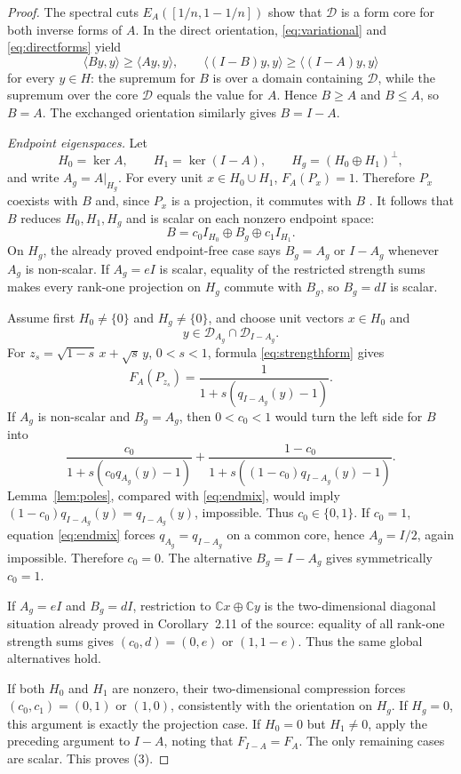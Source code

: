 \documentclass[11pt]{article}
\begin{document}
\begin{proof}
The spectral cuts $E_A([1/n,1-1/n])$ show that $\mathcal D$ is a form core for both inverse forms of $A$.  In the direct orientation, \eqref{eq:variational} and \eqref{eq:directforms} yield
\[
 \langle By,y\rangle\ge\langle Ay,y\rangle,\qquad
 \langle(I-B)y,y\rangle\ge\langle(I-A)y,y\rangle
\]
for every $y\in H$: the supremum for $B$ is over a domain containing $\mathcal D$, while the supremum over the core $\mathcal D$ equals the value for $A$.  Hence $B\ge A$ and $B\le A$, so $B=A$.  The exchanged orientation similarly gives $B=I-A$.

\smallskip
\noindent\emph{Endpoint eigenspaces.}
Let
\[
 H_0=\ker A,\qquad H_1=\ker(I-A),\qquad
 H_g=(H_0\oplus H_1)^\perp,
\]
and write $A_g=A|_{H_g}$.  For every unit $x\in H_0\cup H_1$, $F_A(P_x)=1$.  Therefore $P_x$ coexists with $B$ and, since $P_x$ is a projection, it commutes with $B$ \cite[Lemma~2.1(b)]{GS}.  It follows that $B$ reduces $H_0,H_1,H_g$ and is scalar on each nonzero endpoint space:
\[
 B=c_0I_{H_0}\oplus B_g\oplus c_1I_{H_1}.
\]
On $H_g$, the already proved endpoint-free case says $B_g=A_g$ or $I-A_g$ whenever $A_g$ is non-scalar.  If $A_g=eI$ is scalar, equality of the restricted strength sums makes every rank-one projection on $H_g$ commute with $B_g$, so $B_g=dI$ is scalar.

Assume first $H_0\ne\{0\}$ and $H_g\ne\{0\}$, and choose unit vectors $x\in H_0$ and
\[
 y\in\mathcal D_{A_g}\cap\mathcal D_{I-A_g}.
\]
For $z_s=\sqrt{1-s}\,x+\sqrt{s}\,y$, $0<s<1$, formula \eqref{eq:strengthform} gives
\begin{equation}\label{eq:endmix}
 F_A(P_{z_s})=
 \frac1{1+s(q_{I-A_g}(y)-1)}.
\end{equation}
If $A_g$ is non-scalar and $B_g=A_g$, then $0<c_0<1$ would turn the left side for $B$ into
\[
 \frac{c_0}{1+s(c_0q_{A_g}(y)-1)}
 +\frac{1-c_0}{1+s((1-c_0)q_{I-A_g}(y)-1)}.
\]
Lemma~\ref{lem:poles}, compared with \eqref{eq:endmix}, would imply
$(1-c_0)q_{I-A_g}(y)=q_{I-A_g}(y)$, impossible.  Thus $c_0\in\{0,1\}$.  If $c_0=1$, equation \eqref{eq:endmix} forces $q_{A_g}=q_{I-A_g}$ on a common core, hence $A_g=I/2$, again impossible.  Therefore $c_0=0$.  The alternative $B_g=I-A_g$ gives symmetrically $c_0=1$.

If $A_g=eI$ and $B_g=dI$, restriction to $\mathbb Cx\oplus\mathbb Cy$ is the two-dimensional diagonal situation already proved in Corollary~2.11 of the source: equality of all rank-one strength sums gives $(c_0,d)=(0,e)$ or $(1,1-e)$.  Thus the same global alternatives hold.

If both $H_0$ and $H_1$ are nonzero, their two-dimensional compression forces $(c_0,c_1)=(0,1)$ or $(1,0)$, consistently with the orientation on $H_g$.  If $H_g=0$, this argument is exactly the projection case.  If $H_0=0$ but $H_1\ne0$, apply the preceding argument to $I-A$, noting that $F_{I-A}=F_A$.  The only remaining cases are scalar.  This proves (3).
\end{proof}
\end{document}

